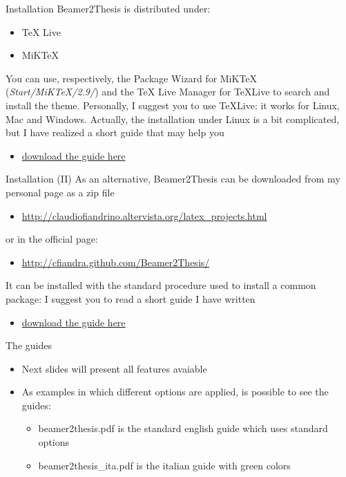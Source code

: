 \begin{tframe}{Installation}
Beamer2Thesis is distributed under:
\begin{itemize}
\item TeX Live
\item MiKTeX
\end{itemize}
You can use, respectively, the Package Wizard for MiK\TeX\, (\emph{Start/MiKTeX/2.9/}) and the TeX Live Manager for \TeX Live to search and install the theme.
Personally, I suggest you to use \TeX Live: it works for Linux, Mac and Windows. Actually, the installation under Linux is a bit complicated, but I have realized a short guide that may help you
\begin{itemize}
\item \href{http://claudiofiandrino.altervista.org/LaTeX/texlive_on_ubuntu_guide.pdf}{download the guide here}
\end{itemize}

\end{tframe}

\begin{tframe}{Installation (II)}
\label{slide-guide-installation}
As an alternative, Beamer2Thesis can be downloaded from my personal page as a zip file
\begin{itemize}
\item \href{http://claudiofiandrino.altervista.org/latex\_projects.html}{http://claudiofiandrino.altervista.org/latex\_projects.html}
\end{itemize}
or in the official page:
\begin{itemize}
\item \href{http://cfiandra.github.com/Beamer2Thesis/}{http://cfiandra.github.com/Beamer2Thesis/}
\end{itemize}

It can be installed with the standard procedure used to install a common package: I suggest you to read a short guide I have written
\begin{itemize}
\item \href{http://claudiofiandrino.altervista.org/LaTeX/package_installation.pdf}{download the guide here}
\end{itemize}
\end{tframe}

\begin{tframe}{The guides}
\begin{itemize}
\item Next slides will present all features avaiable
\item As examples in which different options are applied, is possible to see the guides:
\begin{itemize}
\item beamer2thesis.pdf is the standard english guide which uses standard options
\item beamer2thesis\_ita.pdf is the italian guide with green colors
\end{itemize}
\end{itemize}
\end{tframe}

